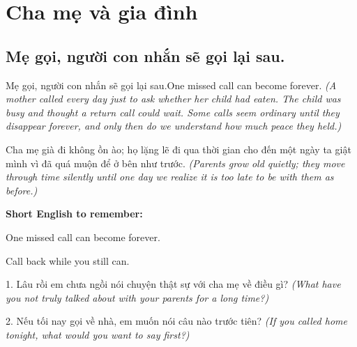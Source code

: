 \chapter{Cha mẹ và gia đình}

\section{Mẹ gọi, người con nhắn sẽ gọi lại sau.}
\begin{truyen}{Mẹ gọi, người con nhắn sẽ gọi lại sau.}{One missed call can become forever.}
\textit{(A mother called every day just to ask whether her child had eaten. The child was busy and thought a return call could wait. Some calls seem ordinary until they disappear forever, and only then do we understand how much peace they held.)}
\end{truyen}
\begin{baihoc}
Cha mẹ già đi không ồn ào; họ lặng lẽ đi qua thời gian cho đến một ngày ta giật mình vì đã quá muộn để ở bên như trước.
\textit{(Parents grow old quietly; they move through time silently until one day we realize it is too late to be with them as before.)}
\end{baihoc}
\begin{ghinhoanh}
\textbf{Short English to remember:}

One missed call can become forever.

Call back while you still can.
\end{ghinhoanh}
\begin{tuhocnhanh}
1. Lâu rồi em chưa ngồi nói chuyện thật sự với cha mẹ về điều gì? \textit{(What have you not truly talked about with your parents for a long time?)}

2. Nếu tối nay gọi về nhà, em muốn nói câu nào trước tiên? \textit{(If you called home tonight, what would you want to say first?)}
\end{tuhocnhanh}
\ngancach

